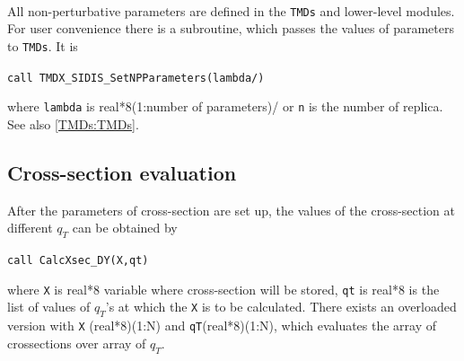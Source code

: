 \documentclass[prd,nofootinbib,eqsecnum,final]{revtex4}
\renewcommand{\(}{\left(}
\renewcommand{\)}{\right)}
\renewcommand{\[}{\left[}
\renewcommand{\]}{\right]}
\begin{document}
~

All non-perturbative parameters are defined in the \texttt{TMDs} and lower-level modules. For user convenience there is a subroutine, which passes the values of parameters to \texttt{TMDs}. It is

\texttt{call TMDX\_SIDIS{\_}SetNPParameters(lambda/)}

where \texttt{lambda} is real*8(1:number of parameters)/ or \texttt{n} is the number of replica. See also \ref{TMDs:TMDs}. 

\subsection{Cross-section evaluation}
\label{TMDXs:xsec}

After the parameters of cross-section are set up, the values of the cross-section at different $q_T$ can be obtained by

\texttt{call CalcXsec\_DY(X,qt)}

where  \texttt{X} is real*8 variable where cross-section will be stored, \texttt{qt} is real*8 is the list of values of $q_T$'s at which the \texttt{X} is to be calculated. There exists an overloaded version with \texttt{X} (real*8)(1:N) and \texttt{qT}(real*8)(1:N), which evaluates the array of crossections over array of $q_T$.
\end{document}
